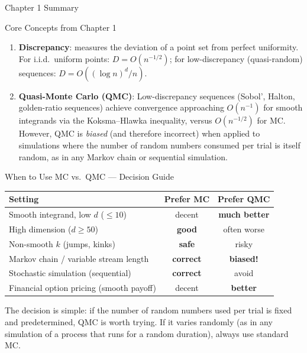\documentclass[aspectratio=169,10pt]{beamer}
\begin{document}
\begin{frame}[allowframebreaks]{Chapter 1 Summary}
\begin{block}{Core Concepts from Chapter 1}
\begin{enumerate}
      \item \textbf{Discrepancy}: measures the deviation of a point set from
        perfect uniformity.  For i.i.d.\ uniform points:
        $D = O(n^{-1/2})$; for low-discrepancy (quasi-random) sequences:
        $D = O((\log n)^d / n)$.

      \item \textbf{Quasi-Monte Carlo (QMC)}: Low-discrepancy sequences
        (Sobol', Halton, golden-ratio sequences) achieve convergence approaching
        $O(n^{-1})$ for smooth integrands via the Koksma--Hlawka inequality,
        versus $O(n^{-1/2})$ for MC.  However, QMC is \emph{biased} (and
        therefore incorrect) when applied to simulations where the number of
        random numbers consumed per trial is itself random, as in any Markov
        chain or sequential simulation.
    \end{enumerate}
  \end{block}

  \framebreak

  \begin{block}{When to Use MC vs.\ QMC --- Decision Guide}
    \begin{center}
    \begin{tabular}{lcc}
      \toprule
      Setting & Prefer MC & Prefer QMC \\
      \midrule
      Smooth integrand, low $d$ ($\le 10$)      & decent  & \textbf{much better} \\
      High dimension ($d \ge 50$)               & \textbf{good}    & often worse \\
      Non-smooth $k$ (jumps, kinks)             & \textbf{safe}    & risky \\
      Markov chain / variable stream length     & \textbf{correct} & \textbf{biased!} \\
      Stochastic simulation (sequential)        & \textbf{correct} & avoid \\
      Financial option pricing (smooth payoff)  & decent  & \textbf{better} \\
      \bottomrule
    \end{tabular}
    \end{center}
    The decision is simple: if the number of random numbers used per trial is
    fixed and predetermined, QMC is worth trying.  If it varies randomly (as in
    any simulation of a process that runs for a random duration), always use
    standard MC.
  \end{block}


\end{frame}
\end{document}

